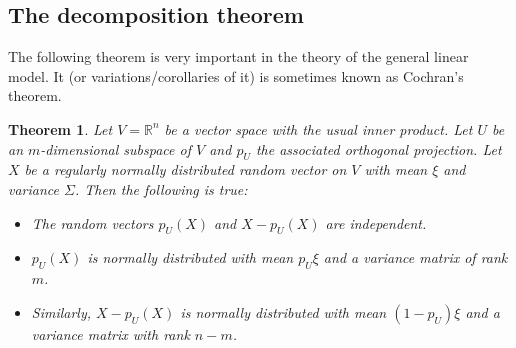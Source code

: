 \documentclass[12pt, a4paper]{article}
\newtheorem{theorem}{Theorem}[section]
\numberwithin{equation}{section}
\begin{document}
\subsection{The decomposition theorem}
The following theorem is very important in the theory of the general linear model. It (or variations/corollaries of it) is sometimes known as Cochran's theorem.
\begin{theorem}
Let $V=\mathbb{R}^n$ be a vector space with the usual inner product. Let $U$ be an $m$-dimensional subspace of $V$ and $p_U$ the associated orthogonal projection. Let $X$ be a regularly normally distributed random vector on $V$ with mean $\xi$ and variance $\Sigma$. Then the following is true:
\begin{itemize}
\item The random vectors $p_U(X)$ and $X-p_U(X)$ are independent.
\item $p_U(X)$ is normally distributed with mean $p_U\xi$ and a variance matrix of rank $m$.
\item Similarly, $X-p_U(X)$ is normally distributed with mean $(1-p_U)\xi$ and a variance matrix with rank $n-m$.
\end{itemize}
\end{theorem}
\end{document}
